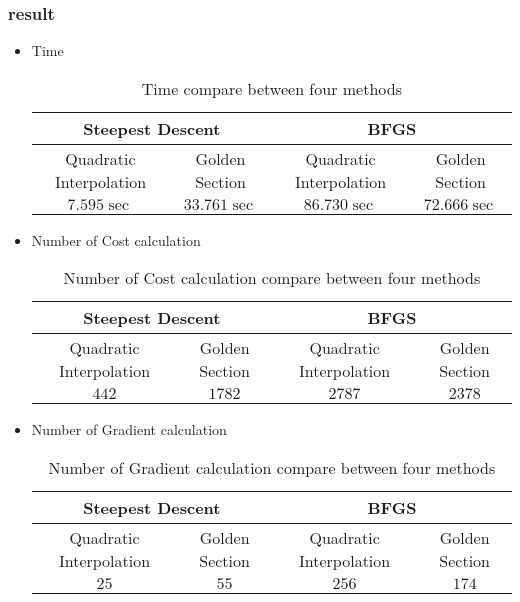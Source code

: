 \subsubsection{result}
\begin{itemize}
\item Time
	\begin{table}[H]
		\caption {Time compare between four methods} 
		\begin{center}
			\begin{tabular}{ |c|c|c|c| }
				\hline
				\multicolumn{2}{|c|}{Steepest Descent} &
				\multicolumn{2}{|c|}{BFGS} \Tstrut\\
				\hline
				Quadratic Interpolation & Golden Section & Quadratic Interpolation &
				Golden Section \Tstrut\\
				\hline
				$7.595\sec$ & $33.761\sec$ & $86.730\sec$ & $72.666\sec$\Tstrut\\
				\hline
			\end{tabular}
		\end{center}
	\end{table}
\item Number of Cost calculation
\begin{table}[H]
	\caption {Number of Cost calculation compare between four methods} 
	\begin{center}
		\begin{tabular}{ |c|c|c|c| }
			\hline
			\multicolumn{2}{|c|}{Steepest Descent} &
			\multicolumn{2}{|c|}{BFGS} \Tstrut\\
			\hline
			Quadratic Interpolation & Golden Section & Quadratic Interpolation &
			Golden Section \Tstrut\\
			\hline
			$442$ & $1782$ & $2787$ & $2378$\Tstrut\\
			\hline
		\end{tabular}
	\end{center}
\end{table}
\item Number of Gradient calculation
\begin{table}[H]
	\caption {Number of Gradient calculation compare between four methods} 
	\begin{center}
		\begin{tabular}{ |c|c|c|c| }
			\hline
			\multicolumn{2}{|c|}{Steepest Descent} &
			\multicolumn{2}{|c|}{BFGS} \Tstrut\\
			\hline
			Quadratic Interpolation & Golden Section & Quadratic Interpolation &
			Golden Section \Tstrut\\
			\hline
			$25$ & $55$ & $256$ & $174$\Tstrut\\
			\hline
		\end{tabular}
	\end{center}
\end{table}
\end{itemize}